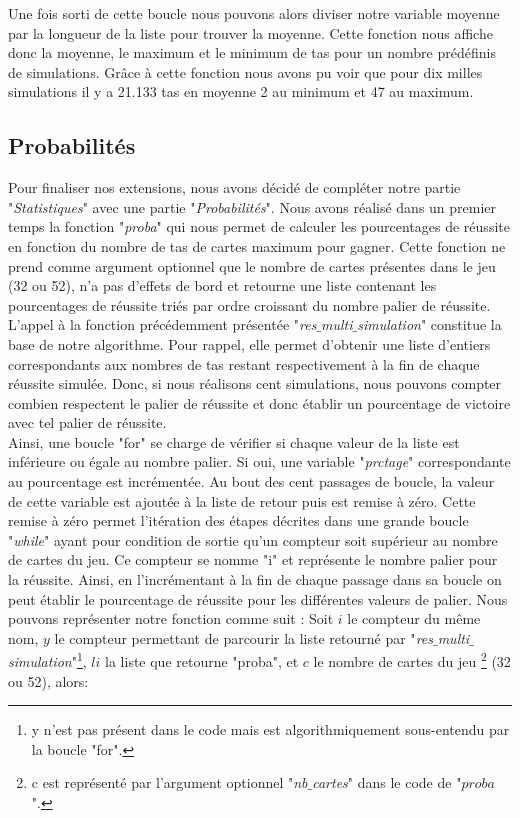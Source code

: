 \documentclass[10pt,a4paper,french,titlepage]{article}
\theoremstyle{definition}
\begin{document}
Une fois sorti de cette boucle nous pouvons alors diviser notre variable moyenne par la longueur de la liste pour trouver la moyenne. Cette fonction nous affiche donc la moyenne, le maximum et le minimum de tas pour un nombre prédéfinis de simulations. Grâce à cette fonction nous avons pu voir que pour dix milles simulations il y a 21.133 tas en moyenne 2 au minimum et 47 au maximum.


\subsection{Probabilités}
Pour finaliser nos extensions, nous avons décidé de compléter notre partie "\textit{Statistiques}" avec une partie "\textit{Probabilités}". Nous avons réalisé dans un premier temps la fonction "\textit{proba}" qui nous permet de calculer les pourcentages de réussite en fonction du nombre de tas de cartes maximum pour gagner. Cette fonction ne prend comme argument optionnel que le nombre de cartes présentes dans le jeu (32 ou 52), n'a pas d'effets de bord et retourne une liste contenant les pourcentages de réussite triés par ordre croissant du nombre palier de réussite. L'appel à la fonction précédemment présentée "\textit{res$\_$multi$\_$simulation}" constitue la base de notre algorithme. Pour rappel, elle permet d'obtenir une liste d'entiers correspondants aux nombres de tas restant respectivement à la fin de chaque réussite simulée.
Donc, si nous réalisons cent simulations, nous pouvons compter combien respectent le palier de réussite et donc établir un pourcentage de victoire avec tel palier de réussite.\\

Ainsi, une boucle "for" se charge de vérifier si chaque valeur de la liste est inférieure ou égale au nombre palier. Si oui, une variable "\textit{prctage}" 
correspondante au pourcentage est incrémentée. Au bout des cent passages de boucle, la valeur de cette variable est ajoutée à la liste de retour puis est remise à zéro. Cette remise à zéro permet l'itération des étapes décrites dans une grande boucle "\textit{while}" ayant pour condition de sortie qu'un compteur soit supérieur au nombre de cartes du jeu. Ce compteur se nomme "i" et représente le nombre palier pour la réussite. Ainsi, en l'incrémentant à la fin de chaque passage dans sa boucle on peut établir le pourcentage de réussite pour les différentes valeurs de palier. Nous pouvons représenter notre fonction comme suit : 
Soit $i$ le compteur du même nom, $y$ le compteur permettant de parcourir la liste retourné par "\textit{res$\_$multi$\_$simulation}"\footnote{y n'est pas présent dans le code mais est algorithmiquement sous-entendu par la boucle "for".}, $li$ la liste que retourne "proba", et $c$ le nombre de cartes du jeu \footnote{c est représenté par l'argument optionnel "\textit{nb$\_$cartes}" dans le code de "$proba$".} (32 ou 52), alors:
\end{document}
